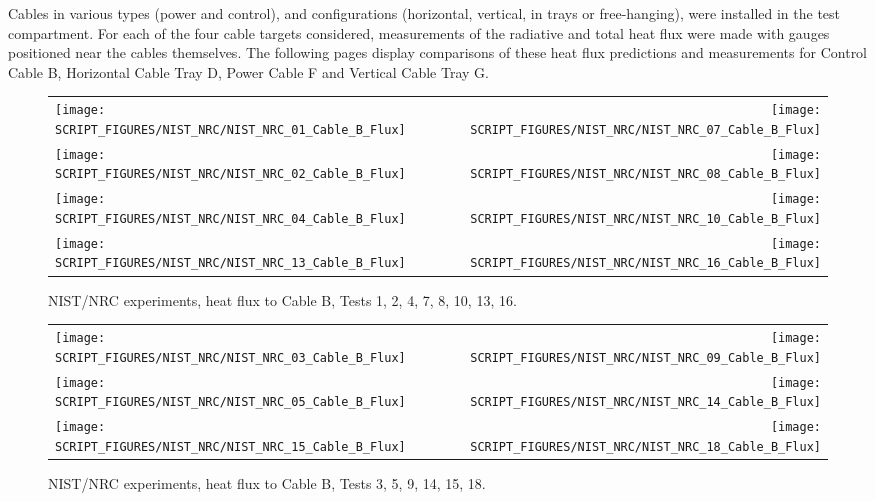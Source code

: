Cables in various types (power and control), and configurations (horizontal, vertical, in trays or free-hanging), were installed in
the test compartment. For each of the four cable targets considered, measurements of the radiative and total heat flux were made with
gauges positioned near the cables themselves.  The following pages display comparisons of these heat flux predictions and measurements for
Control Cable B, Horizontal Cable Tray D, Power Cable F and Vertical Cable Tray G.

\newpage

\begin{figure}[p]
\begin{tabular*}{\textwidth}{l@{\extracolsep{\fill}}r}
\texttt{[image: SCRIPT\_FIGURES/NIST\_NRC/NIST\_NRC\_01\_Cable\_B\_Flux]} &
\texttt{[image: SCRIPT\_FIGURES/NIST\_NRC/NIST\_NRC\_07\_Cable\_B\_Flux]} \\
\texttt{[image: SCRIPT\_FIGURES/NIST\_NRC/NIST\_NRC\_02\_Cable\_B\_Flux]} &
\texttt{[image: SCRIPT\_FIGURES/NIST\_NRC/NIST\_NRC\_08\_Cable\_B\_Flux]} \\
\texttt{[image: SCRIPT\_FIGURES/NIST\_NRC/NIST\_NRC\_04\_Cable\_B\_Flux]} &
\texttt{[image: SCRIPT\_FIGURES/NIST\_NRC/NIST\_NRC\_10\_Cable\_B\_Flux]} \\
\texttt{[image: SCRIPT\_FIGURES/NIST\_NRC/NIST\_NRC\_13\_Cable\_B\_Flux]} &
\texttt{[image: SCRIPT\_FIGURES/NIST\_NRC/NIST\_NRC\_16\_Cable\_B\_Flux]}
\end{tabular*}
\caption{NIST/NRC experiments, heat flux to Cable B, Tests 1, 2, 4, 7, 8, 10, 13, 16.}
\label{NIST_NRC_Cable_B_Flux_Closed}
\end{figure}

\begin{figure}[p]
\begin{tabular*}{\textwidth}{l@{\extracolsep{\fill}}r}
\texttt{[image: SCRIPT\_FIGURES/NIST\_NRC/NIST\_NRC\_03\_Cable\_B\_Flux]} &
\texttt{[image: SCRIPT\_FIGURES/NIST\_NRC/NIST\_NRC\_09\_Cable\_B\_Flux]} \\
\texttt{[image: SCRIPT\_FIGURES/NIST\_NRC/NIST\_NRC\_05\_Cable\_B\_Flux]} &
\texttt{[image: SCRIPT\_FIGURES/NIST\_NRC/NIST\_NRC\_14\_Cable\_B\_Flux]} \\
\texttt{[image: SCRIPT\_FIGURES/NIST\_NRC/NIST\_NRC\_15\_Cable\_B\_Flux]} &
\texttt{[image: SCRIPT\_FIGURES/NIST\_NRC/NIST\_NRC\_18\_Cable\_B\_Flux]}
\end{tabular*}
\caption{NIST/NRC experiments, heat flux to Cable B, Tests 3, 5, 9, 14, 15, 18.}
\label{NIST_NRC_Cable_B_Flux_Open}
\end{figure}

